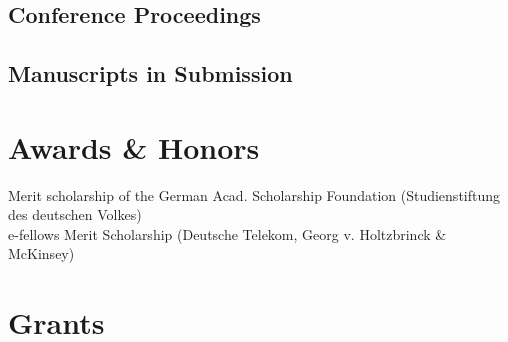 \documentclass[11pt]{article} %
\begin{document}
\subsection*{Conference Proceedings}


\subsection*{Manuscripts in Submission}


\section*{Awards \& Honors}

Merit scholarship of the German Acad. Scholarship Foundation (Studienstiftung des deutschen Volkes)\\
e-fellows Merit Scholarship (Deutsche Telekom, Georg v. Holtzbrinck \& McKinsey)

\section*{Grants}
\end{document}
